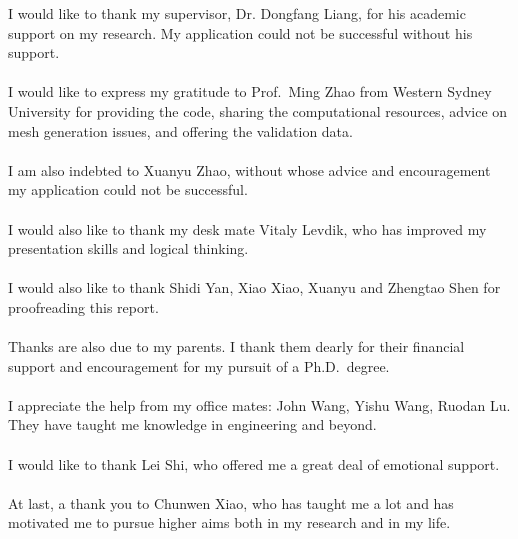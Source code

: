 \begin{acknowledgements}      

I would like to thank my supervisor, Dr. Dongfang Liang, for his academic support on my research. My application could not be successful without his support.
\\
\\
I would like to express my gratitude to Prof.\  Ming Zhao from Western Sydney University for providing the code, sharing the computational resources, advice on mesh generation issues, and offering the validation data.
\\
\\
I am also indebted to Xuanyu Zhao, without whose advice and encouragement my application could not be successful.
\\
\\
I would also like to thank my desk mate Vitaly Levdik, who has improved my presentation skills and logical thinking.
\\
\\
I would also like to thank Shidi Yan, Xiao Xiao, Xuanyu and Zhengtao Shen for proofreading this report.
\\
\\
Thanks are also due to my parents. I thank them dearly for their financial support and encouragement for my pursuit of a Ph.D.\ degree.
\\
\\
I appreciate the help from my office mates: John Wang, Yishu Wang, Ruodan Lu. They have taught me knowledge in engineering and beyond.
\\
\\
I would like to thank Lei Shi, who offered me a great deal of emotional support. 
\\
\\
At last, a thank you to Chunwen Xiao, who has taught me a lot and has motivated me to pursue higher aims both in my research and in my life.


\end{acknowledgements}